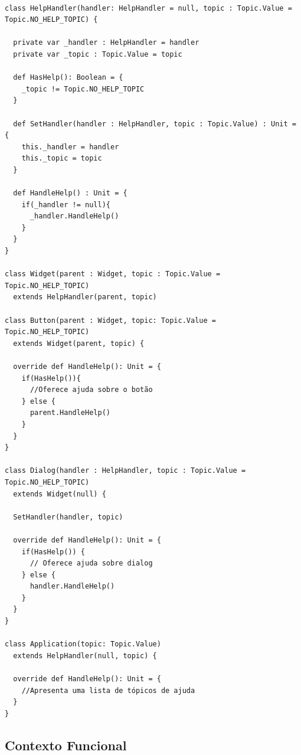 \begin{lstlisting}[caption={Chain of Responsibility Orientação a Objetos},label=oochresponsibility]

class HelpHandler(handler: HelpHandler = null, topic : Topic.Value = Topic.NO_HELP_TOPIC) {

  private var _handler : HelpHandler = handler
  private var _topic : Topic.Value = topic

  def HasHelp(): Boolean = {
    _topic != Topic.NO_HELP_TOPIC
  }

  def SetHandler(handler : HelpHandler, topic : Topic.Value) : Unit = {
    this._handler = handler
    this._topic = topic
  }

  def HandleHelp() : Unit = {
    if(_handler != null){
      _handler.HandleHelp()
    }
  }
}

class Widget(parent : Widget, topic : Topic.Value = Topic.NO_HELP_TOPIC)
  extends HelpHandler(parent, topic)
  
class Button(parent : Widget, topic: Topic.Value = Topic.NO_HELP_TOPIC)
  extends Widget(parent, topic) {

  override def HandleHelp(): Unit = {
    if(HasHelp()){
      //Oferece ajuda sobre o botão
    } else {
      parent.HandleHelp()
    }
  }
}

class Dialog(handler : HelpHandler, topic : Topic.Value = Topic.NO_HELP_TOPIC)
  extends Widget(null) {

  SetHandler(handler, topic)

  override def HandleHelp(): Unit = {
    if(HasHelp()) {
      // Oferece ajuda sobre dialog
    } else {
      handler.HandleHelp()
    }
  }
}

class Application(topic: Topic.Value)
  extends HelpHandler(null, topic) {

  override def HandleHelp(): Unit = {
    //Apresenta uma lista de tópicos de ajuda
  }
}

\end{lstlisting}

\subsection*{Contexto Funcional}

\begin{lstlisting}[caption={Chain of Responsibility Funcional},label=fpchresponsibility]
    

    
\end{lstlisting}